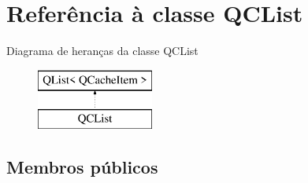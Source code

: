 \hypertarget{class_q_c_list}{\section{Referência à classe Q\-C\-List}
\label{class_q_c_list}
}
Diagrama de heranças da classe Q\-C\-List\begin{figure}[H]
\begin{center}
\leavevmode
\includegraphics[height=2.000000cm]{class_q_c_list}
\end{center}
\end{figure}
\subsection*{Membros públicos}
